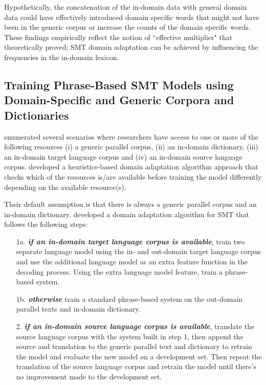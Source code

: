 Hypothetically, the concatenation of the in-domain data with general domain data could have effectively introduced domain specific words that might not have been in the generic corpus or increase the counts of the domain specific words. These findings empirically reflect the notion of ``effective multiplier" that \cite{brown1993dictionaries} theoretically proved; SMT domain adaptation can be achieved by influencing the frequencies in the in-domain lexicon.

\subsection{Training Phrase-Based SMT Models using Domain-Specific and Generic Corpora and Dictionaries}

\cite{wu2008domain} enumerated several scenarios where researchers have access to one or more of the following  resources (i) a generic parallel corpus, (ii) an in-domain dictionary, (iii) an in-domain target language corpus and (iv) an in-domain source language corpus. \cite{wu2008domain} developed a heuristics-based domain adaptation algorithm approach that checks which of the resources is/are available before training the model differently depending on the available resource(s). 

Their default assumption is that there is always a generic parallel corpus and an in-domain dictionary. \cite{wu2008domain} developed a domain adaptation algorithm for SMT that follows the following steps:

\begin{itemize}
\item[1a.] \emph{\textbf{if an in-domain target language corpus is available}}, train two separate language model using the in- and out-domain target language corpus and use the additional language model as an extra feature function in the decoding process. Using the extra language model feature, train a phrase-based system.
\item[1b.] \emph{\textbf{otherwise}} train a standard phrase-based system on the out-domain parallel texts and in-domain dictionary.
\item[2.] \emph{\textbf{if an in-domain source language corpus is available}}, translate the source language corpus with the system built in step 1, then append the source and translation to the generic parallel text and dictionary to retrain the model and evaluate the new model on a development set. Then repeat the translation of the source language corpus and retrain the model until there's no improvement made to the development set.
\end{itemize}

